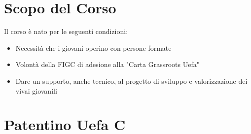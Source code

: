 \documentclass[../uefaC.tex]{subfiles}
\begin{document}

\section{Scopo del Corso}

Il corso è nato per le seguenti condizioni:

\begin{itemize}
    \item{Necessità che i giovani operino con persone formate}
    \item{Volontà della FIGC di adesione alla "Carta Grassroots Uefa"}
    \item{Dare un supporto, anche tecnico, al progetto di sviluppo e valorizzazione dei vivai giovanili}
\end{itemize}

\section{Patentino Uefa C}
\end{document}
